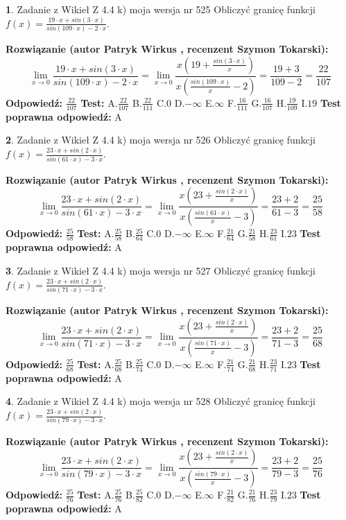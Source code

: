 \documentclass[12pt, a4paper]{article}
\theoremstyle{definition} %
\newtheorem{zad}{}
\newcommand{\zadStart}[1]{\begin{zad}#1\newline}
\newcommand{\zadStop}{\end{zad}}
\newcommand{\rozwStart}[2]{\noindent \textbf{Rozwiązanie (autor #1 , recenzent #2): }\newline}
\newcommand{\rozwStop}{\newline}
\newcommand{\odpStart}{\noindent \textbf{Odpowiedź:}\newline}
\newcommand{\odpStop}{\newline}
\newcommand{\testStart}{\noindent \textbf{Test:}\newline}
\newcommand{\testStop}{\newline}
\newcommand{\kluczStart}{\noindent \textbf{Test poprawna odpowiedź:}\newline}
\newcommand{\kluczStop}{\newline}
\begin{document}
\zadStart{Zadanie z Wikieł Z 4.4 k) moja wersja nr 525}
Obliczyć granicę funkcji $f(x)=\frac{19\cdot x +sin(3\cdot x)}{sin(109\cdot x) -2\cdot x}$.
\zadStop
\rozwStart{Patryk Wirkus}{Szymon Tokarski}
$$\lim\limits_{x\to 0}\frac{19\cdot x +sin(3\cdot x)}{sin(109\cdot x) -2\cdot x}
=\lim\limits_{x\to 0}\frac{x(19+\frac{sin(3\cdot x)}{x})}{x(\frac{sin(109\cdot x)}{x}-2)}
=\frac{19+3}{109-2} = \frac{22}{107}$$
\rozwStop
\odpStart
$\frac{22}{107}$
\odpStop
\testStart
A.$\frac{22}{107}$
B.$\frac{22}{111}$
C.$0$
D.$-\infty$
E.$\infty$
F.$\frac{16}{111}$
G.$\frac{16}{107}$
H.$\frac{19}{109}$
I.$19$
\testStop
\kluczStart
A
\kluczStop



\zadStart{Zadanie z Wikieł Z 4.4 k) moja wersja nr 526}
Obliczyć granicę funkcji $f(x)=\frac{23\cdot x +sin(2\cdot x)}{sin(61\cdot x) -3\cdot x}$.
\zadStop
\rozwStart{Patryk Wirkus}{Szymon Tokarski}
$$\lim\limits_{x\to 0}\frac{23\cdot x +sin(2\cdot x)}{sin(61\cdot x) -3\cdot x}
=\lim\limits_{x\to 0}\frac{x(23+\frac{sin(2\cdot x)}{x})}{x(\frac{sin(61\cdot x)}{x}-3)}
=\frac{23+2}{61-3} = \frac{25}{58}$$
\rozwStop
\odpStart
$\frac{25}{58}$
\odpStop
\testStart
A.$\frac{25}{58}$
B.$\frac{25}{64}$
C.$0$
D.$-\infty$
E.$\infty$
F.$\frac{21}{64}$
G.$\frac{21}{58}$
H.$\frac{23}{61}$
I.$23$
\testStop
\kluczStart
A
\kluczStop



\zadStart{Zadanie z Wikieł Z 4.4 k) moja wersja nr 527}
Obliczyć granicę funkcji $f(x)=\frac{23\cdot x +sin(2\cdot x)}{sin(71\cdot x) -3\cdot x}$.
\zadStop
\rozwStart{Patryk Wirkus}{Szymon Tokarski}
$$\lim\limits_{x\to 0}\frac{23\cdot x +sin(2\cdot x)}{sin(71\cdot x) -3\cdot x}
=\lim\limits_{x\to 0}\frac{x(23+\frac{sin(2\cdot x)}{x})}{x(\frac{sin(71\cdot x)}{x}-3)}
=\frac{23+2}{71-3} = \frac{25}{68}$$
\rozwStop
\odpStart
$\frac{25}{68}$
\odpStop
\testStart
A.$\frac{25}{68}$
B.$\frac{25}{74}$
C.$0$
D.$-\infty$
E.$\infty$
F.$\frac{21}{74}$
G.$\frac{21}{68}$
H.$\frac{23}{71}$
I.$23$
\testStop
\kluczStart
A
\kluczStop



\zadStart{Zadanie z Wikieł Z 4.4 k) moja wersja nr 528}
Obliczyć granicę funkcji $f(x)=\frac{23\cdot x +sin(2\cdot x)}{sin(79\cdot x) -3\cdot x}$.
\zadStop
\rozwStart{Patryk Wirkus}{Szymon Tokarski}
$$\lim\limits_{x\to 0}\frac{23\cdot x +sin(2\cdot x)}{sin(79\cdot x) -3\cdot x}
=\lim\limits_{x\to 0}\frac{x(23+\frac{sin(2\cdot x)}{x})}{x(\frac{sin(79\cdot x)}{x}-3)}
=\frac{23+2}{79-3} = \frac{25}{76}$$
\rozwStop
\odpStart
$\frac{25}{76}$
\odpStop
\testStart
A.$\frac{25}{76}$
B.$\frac{25}{82}$
C.$0$
D.$-\infty$
E.$\infty$
F.$\frac{21}{82}$
G.$\frac{21}{76}$
H.$\frac{23}{79}$
I.$23$
\testStop
\kluczStart
A
\kluczStop
\end{document}
